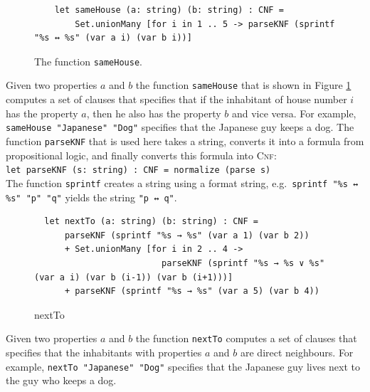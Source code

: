 \begin{figure}[!ht]
\centering
\begin{verbatim}
    let sameHouse (a: string) (b: string) : CNF =
        Set.unionMany [for i in 1 .. 5 -> parseKNF (sprintf "%s ↔ %s" (var a i) (var b i))]
\end{verbatim}
\vspace*{-0.3cm}
\caption{The function \texttt{sameHouse}.}
\label{fig:sameHouse}
\end{figure}

Given two properties $a$ and $b$ the function \texttt{sameHouse} that is
shown in Figure \ref{fig:sameHouse} computes
a set of clauses that specifies that if the inhabitant of house number $i$ has
the property $a$, then he also has the property $b$ and vice versa.  For
example, \texttt{sameHouse "Japanese" "Dog"} specifies
that the Japanese guy keeps a dog.  The function \texttt{parseKNF} that is used here takes a string, converts
it into a formula from propositional logic, and finally converts this formula into \textsc{Cnf}:
\\[0.2cm]
\hspace*{1.3cm}
\texttt{let parseKNF (s: string) : CNF = normalize (parse s)}
\\[0.2cm]
The function \texttt{sprintf} creates a string using a format string, e.g.~\texttt{sprintf "\%s ↔ \%s" "p" "q"}
yields the string \texttt{"p ↔ q"}.


\begin{figure}[!ht]
\centering
\begin{verbatim}
  let nextTo (a: string) (b: string) : CNF =
      parseKNF (sprintf "%s → %s" (var a 1) (var b 2))
      + Set.unionMany [for i in 2 .. 4 ->
                         parseKNF (sprintf "%s → %s ∨ %s" (var a i) (var b (i-1)) (var b (i+1)))]
      + parseKNF (sprintf "%s → %s" (var a 5) (var b 4))
\end{verbatim}
\vspace*{-0.3cm}
\caption{nextTo}
\label{fig:nextTo}
\end{figure}
Given two properties $a$ and $b$ the function \texttt{nextTo} computes a
set of clauses that specifies that the inhabitants with properties $a$ and $b$
are direct neighbours.  For example, \texttt{nextTo "Japanese" "Dog"}
specifies that the Japanese guy lives next to the guy who keeps a dog. 


